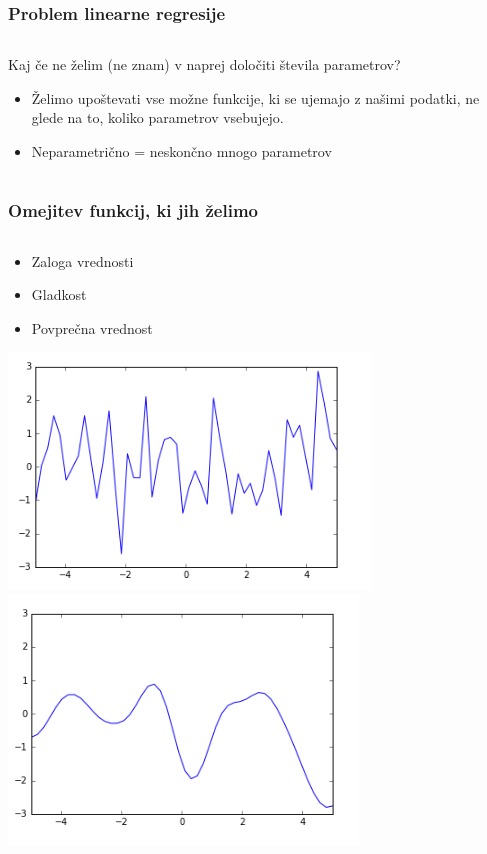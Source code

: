 \documentclass{beamer}
\begin{document}
\begin{frame}

\frametitle{Problem linearne regresije}
\begin{columns}
\begin{column}{12cm}

\alert{Kaj če ne želim (ne znam) v naprej določiti števila parametrov?}
\begin{itemize}
\item Želimo upoštevati vse možne funkcije, ki se ujemajo z našimi podatki, ne glede na to, koliko parametrov vsebujejo.
\item Neparametrično = neskončno mnogo parametrov
\end{itemize}

\end{column}
\end{columns}
\end{frame}



\begin{frame}

\frametitle{Omejitev funkcij, ki jih želimo}
\begin{columns}
\begin{column}{12cm}

\begin{itemize}
\item Zaloga vrednosti
\item \alert{Gladkost}
\item Povprečna vrednost
\end{itemize}
\includegraphics[scale=0.5]{vjuga}
\includegraphics[scale=0.5]{gladka}
\end{column}


\end{columns}
\end{frame}
\end{document}

